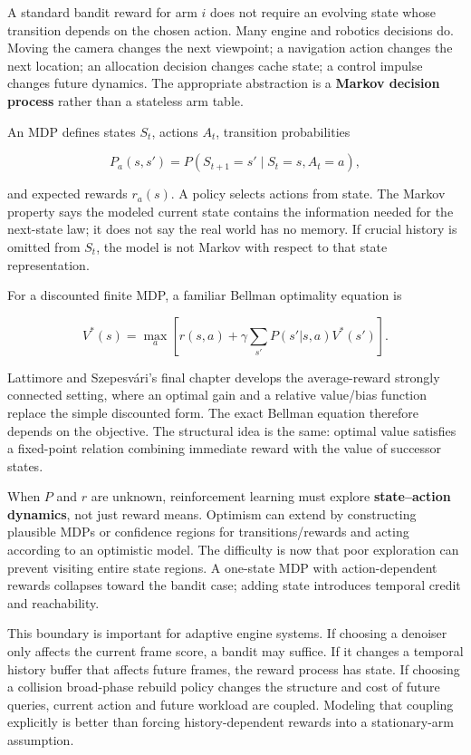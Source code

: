 A standard bandit reward for arm \(i\) does not require an evolving state whose transition depends on the chosen action. Many engine and robotics decisions do. Moving the camera changes the next viewpoint; a navigation action changes the next location; an allocation decision changes cache state; a control impulse changes future dynamics. The appropriate abstraction is a \textbf{Markov decision process} rather than a stateless arm table.

An MDP defines states \(S_t\), actions \(A_t\), transition probabilities

\[
P_a(s,s')
=
P(S_{t+1}=s'\mid S_t=s,A_t=a),
\]

and expected rewards \(r_a(s)\). A policy selects actions from state. The Markov property says the modeled current state contains the information needed for the next-state law; it does not say the real world has no memory. If crucial history is omitted from \(S_t\), the model is not Markov with respect to that state representation.

For a discounted finite MDP, a familiar Bellman optimality equation is

\[
V^*(s)
=
\max_a
\left[
r(s,a)
+
\gamma
\sum_{s'}
P(s'|s,a)V^*(s')
\right].
\]

Lattimore and Szepesvári's final chapter develops the average-reward strongly connected setting, where an optimal gain and a relative value/bias function replace the simple discounted form. The exact Bellman equation therefore depends on the objective. The structural idea is the same: optimal value satisfies a fixed-point relation combining immediate reward with the value of successor states.

When \(P\) and \(r\) are unknown, reinforcement learning must explore \textbf{state--action dynamics}, not just reward means. Optimism can extend by constructing plausible MDPs or confidence regions for transitions/rewards and acting according to an optimistic model. The difficulty is now that poor exploration can prevent visiting entire state regions. A one-state MDP with action-dependent rewards collapses toward the bandit case; adding state introduces temporal credit and reachability.

This boundary is important for adaptive engine systems. If choosing a denoiser only affects the current frame score, a bandit may suffice. If it changes a temporal history buffer that affects future frames, the reward process has state. If choosing a collision broad-phase rebuild policy changes the structure and cost of future queries, current action and future workload are coupled. Modeling that coupling explicitly is better than forcing history-dependent rewards into a stationary-arm assumption.

